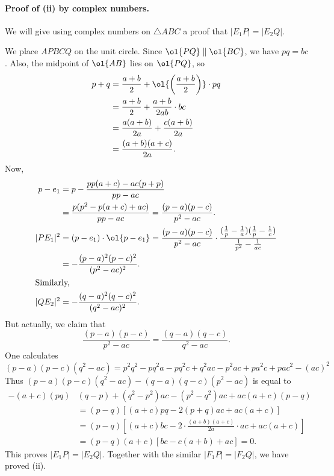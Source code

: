 \documentclass[11pt]{scrartcl}
\begin{document}
\paragraph{Proof of (ii) by complex numbers.}
We will give using complex numbers on $\triangle ABC$
a proof that $|E_1P| = |E_2Q|$.

We place $APBCQ$ on the unit circle.
Since $\ol{PQ} \parallel \ol{BC}$, we have $pq = bc$.
Also, the midpoint of $\ol{AB}$ lies on $\ol{PQ}$, so
\begin{align*}
  p+q
  &= \frac{a+b}{2} + \ol{\left( \frac{a+b}{2} \right)} \cdot pq \\
  &= \frac{a+b}{2} + \frac{a+b}{2ab} \cdot bc \\
  &= \frac{a(a+b)}{2a} + \frac{c(a+b)}{2a} \\
  &= \frac{(a+b)(a+c)}{2a}.
\end{align*}
Now,
\begin{align*}
  p-e_1 &= p - \frac{pp(a+c)-ac(p+p)}{pp-ac} \\
  &= \frac{p(p^2-p(a+c)+ac)}{pp-ac} = \frac{(p-a)(p-c)}{p^2-ac}. \\
  |PE_1|^2 &= (p-e_1) \cdot \ol{p-e_1} =
  \frac{(p-a)(p-c)}{p^2-ac} \cdot
  \frac{(\frac1p-\frac1a)(\frac1p-\frac1c)}{\frac{1}{p^2}-\frac{1}{ac}} \\
  &= -\frac{(p-a)^2(p-c)^2}{(p^2-ac)^2}. \\
  \intertext{Similarly,}
  |QE_2|^2 &= -\frac{(q-a)^2(q-c)^2}{(q^2-ac)^2}.
\end{align*}
But actually, we claim that
\[ \frac{(p-a)(p-c)}{p^2-ac} = \frac{(q-a)(q-c)}{q^2-ac}. \]
One calculates
\[ (p-a)(p-c)(q^2-ac)
  = p^2q^2 - pq^2a - pq^2c + q^2ac
  - p^2ac + pa^2c + pac^2 - (ac)^2 \]
Thus $(p-a)(p-c)(q^2-ac) - (q-a)(q-c)(p^2-ac)$
is equal to
\begin{align*}
  -(a+c)(pq) &(q-p) + (q^2-p^2)ac - (p^2-q^2)ac + ac(a+c)(p-q) \\
  &= (p-q)
  \left[ (a+c)pq - 2(p+q)ac + ac(a+c) \right] \\
  &= (p-q)
  \left[ (a+c)bc - 2 \cdot \frac{(a+b)(a+c)}{2a} \cdot ac + ac(a+c) \right] \\
  &= (p-q)(a+c) \left[ bc - c(a+b) + ac \right] = 0.
\end{align*}
This proves $|E_1P| = |E_2Q|$.
Together with the similar $|F_1P| = |F_2Q|$, we have proved (ii).
\end{document}
